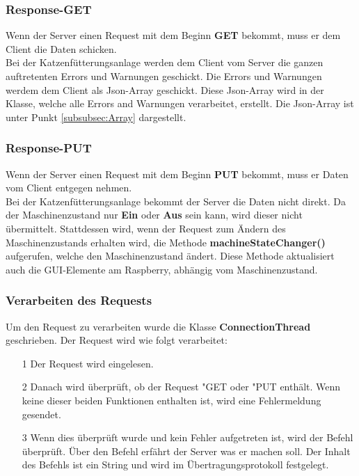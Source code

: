 \newpage

\subsubsection{Response-GET}
Wenn der Server einen Request mit dem Beginn \textbf{GET} bekommt, muss er dem Client die Daten schicken. 
\\ Bei der Katzenfütterungsanlage werden dem Client vom Server die ganzen auftretenten Errors und Warnungen geschickt. Die Errors und Warnungen werdem dem Client als Json-Array geschickt. Diese Json-Array wird in der Klasse, welche alle Errors and Warnungen verarbeitet, erstellt. Die Json-Array ist unter Punkt \ref{subsubsec:Array} dargestellt. 

\subsubsection{Response-PUT}
Wenn der Server einen Request mit dem Beginn \textbf{PUT} bekommt, muss er Daten vom Client entgegen nehmen.
\\ Bei der Katzenfütterungsanlage bekommt der Server die Daten nicht direkt. Da der Maschinenzustand nur \textbf{Ein} oder \textbf{Aus} sein kann, wird dieser nicht übermittelt. Stattdessen wird, wenn der Request zum Ändern des Maschinenzustands erhalten wird, die Methode \textbf{machineStateChanger()} aufgerufen, welche den Maschinenzustand ändert. Diese Methode aktualisiert auch die GUI-Elemente am Raspberry, abhängig vom Maschinenzustand. 

\subsubsection{Verarbeiten des Requests}
Um den Request zu verarbeiten wurde die Klasse \textbf{ConnectionThread} geschrieben. Der Request wird wie folgt verarbeitet:
\begin{itemize}
\item[1] Der Request wird eingelesen.
\item[2] Danach wird überprüft, ob der Request "GET\grqq{} oder "PUT\grqq{} enthält. Wenn keine dieser beiden Funktionen enthalten ist, wird eine Fehlermeldung gesendet.
\item[3] Wenn dies überprüft wurde und kein Fehler aufgetreten ist, wird der Befehl überprüft. Über den Befehl erfährt der Server was er machen soll. Der Inhalt des Befehls ist ein String und wird im Übertragungsprotokoll festgelegt.
\end{itemize}

